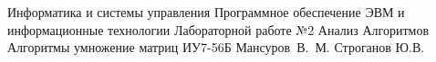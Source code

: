 \makereporttitle
{Информатика и системы управления}
{Программное обеспечение ЭВМ и информационные технологии}
{Лабораторной работе №2}
{Анализ Алгоритмов}
{Алгоритмы умножение матриц}
{}
{ИУ7-56Б}
{Мансуров~В.~М.}
{Строганов Ю.В.}

\maketableofcontents
\setcounter{page}{1}
	